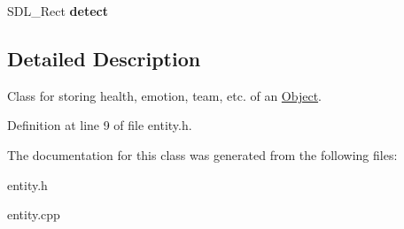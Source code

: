 \begin{DoxyCompactItemize}
\item 
S\+D\+L\+\_\+\+Rect {\bfseries detect}\hypertarget{classEntity_a6c75cb5ab8a495f4c0bfda53a53e8432}{}\label{classEntity_a6c75cb5ab8a495f4c0bfda53a53e8432}

\end{DoxyCompactItemize}


\subsection{Detailed Description}
Class for storing health, emotion, team, etc. of an \hyperlink{classObject}{Object}. 

Definition at line 9 of file entity.\+h.



The documentation for this class was generated from the following files\+:\begin{DoxyCompactItemize}
\item 
entity.\+h\item 
entity.\+cpp\end{DoxyCompactItemize}
